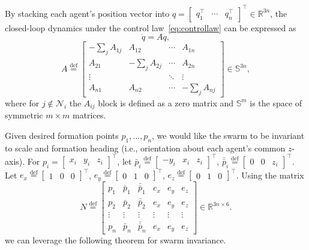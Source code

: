 \documentclass[a4paper]{article}
\begin{document}
By stacking each agent's position vector into $q=\begin{bmatrix}q_1^\top&\cdots&q_n^\top\end{bmatrix}^\top\in\mathbb{R}^{3n}$, the closed-loop dynamics under the control law~\eqref{eq:controllaw} can be expressed as
\begin{equation}\label{eq:swarm-dynamics}
\dot{q}=Aq,
\end{equation}
\begin{equation}\label{eq:gainmatrix}
A \stackrel{\text{def}}{=}
\begin{bmatrix}
-\sum_{j} A_{1j} & A_{12} & \cdots & A_{1n} \\
A_{21} & -\sum_{j} A_{2j} & \cdots & A_{2n} \\
\vdots &                          & \ddots & \vdots \\
A_{n1} &       A_{n2}             & \cdots &  -\sum_{j} A_{nj}   
\end{bmatrix} \in \mathbb{S}^{3n},
\end{equation}
where for $j\notin\mathcal{N}_i$ the $A_{ij}$ block is defined as a zero matrix and $\mathbb{S}^m$ is the space of symmetric $m\times m$ matrices.

Given desired formation points $p_1,\dots,p_n$, we would like the swarm to be invariant to scale and formation heading (i.e., orientation about each agent's common $z$-axis).
For $p_i=\begin{bmatrix}x_i&y_i&z_i\end{bmatrix}^\top$, let $\bar{p}_i\stackrel{\text{def}}{=}\begin{bmatrix}-y_i&x_i&z_i\end{bmatrix}^\top$, $\bar{\bar{p}}_i\stackrel{\text{def}}{=}\begin{bmatrix}0&0&z_i\end{bmatrix}^\top$.
Let $e_x\stackrel{\text{def}}{=}\begin{bmatrix}1&0&0\end{bmatrix}^\top$, $e_y\stackrel{\text{def}}{=}\begin{bmatrix}0&1&0\end{bmatrix}^\top$, $e_z\stackrel{\text{def}}{=}\begin{bmatrix}0&1&0\end{bmatrix}^\top$.
Using the matrix
\begin{equation} \label{eq:N}
N \stackrel{\text{def}}{=} \begin{bmatrix}
p_1 & \bar{p}_1 & \bar{\bar{p}}_1 &  e_x & e_y & e_z \\ 
p_2 & \bar{p}_2 & \bar{\bar{p}}_2 &  e_x & e_y & e_z \\
\vdots &  \vdots & \vdots & \vdots & \vdots & \vdots \\ 
p_n & \bar{p}_n & \bar{\bar{p}}_n &  e_x & e_y & e_z 
\end{bmatrix} \in \mathbb{R}^{3n\times 6}.
\end{equation}
we can leverage the following theorem for swarm invariance.
\end{document}
